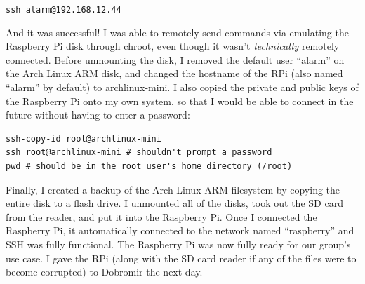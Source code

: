 \Verb"ssh alarm@192.168.12.44"

And it was successful! I was able to remotely send commands via emulating the Raspberry Pi disk through chroot, even though it wasn't \textit{technically} remotely connected. Before unmounting the disk, I removed the default user “alarm” on the Arch Linux ARM disk, and changed the hostname of the RPi (also named “alarm” by default) to archlinux-mini. I also copied the private and public keys of the Raspberry Pi onto my own system, so that I would be able to connect in the future without having to enter a password:

\begin{verbatim}
ssh-copy-id root@archlinux-mini
ssh root@archlinux-mini # shouldn't prompt a password
pwd # should be in the root user's home directory (/root)
\end{verbatim}


Finally, I created a backup of the Arch Linux ARM filesystem by copying the entire disk to a flash drive. I unmounted all of the disks, took out the SD card from the reader, and put it into the Raspberry Pi. Once I connected the Raspberry Pi, it automatically connected to the network named “raspberry” and SSH was fully functional. The Raspberry Pi was now fully ready for our group's use case. I gave the RPi (along with the SD card reader if any of the files were to become corrupted) to Dobromir the next day.

    


